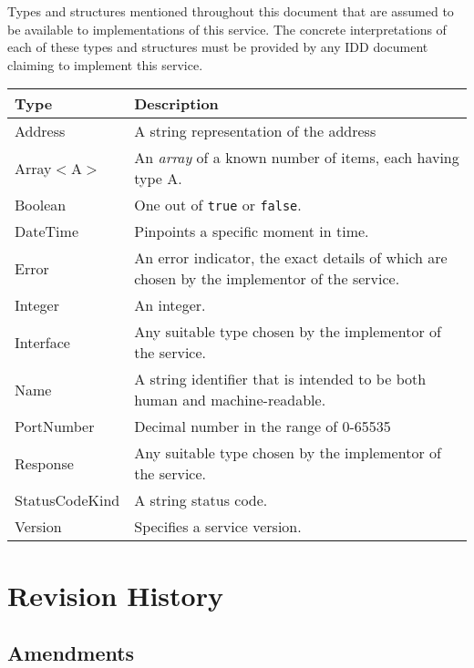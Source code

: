 \documentclass[a4paper]{arrowhead}
\newcommand{\pdef}[1]{{\textcolor{ArrowheadGrey}{#1\label{sec:model:primitives:#1}\label{sec:model:primitives:#1s}\label{sec:model:primitives:#1es}}}}
\begin{document}
Types and structures mentioned throughout this document that are assumed to be available to implementations of this service.
The concrete interpretations of each of these types and structures must be provided by any IDD document claiming to implement this service.


\begin{table}[ht!]
\begin{tabularx}{\textwidth}{| p{3cm} | X |} \hline
\rowcolor{gray!33} Type & Description \\ \hline
\pdef{Address}          & A string representation of the address \\ \hline
\pdef{Array}$<$A$>$     & An \textit{array} of a known number of items, each having type A. \\ \hline
\pdef{Boolean}          & One out of \texttt{true} or \texttt{false}. \\ \hline
\pdef{DateTime}         & Pinpoints a specific moment in time. \\ \hline
\pdef{Error}            & An error indicator, the exact details of which are chosen by the implementor of the service. \\ \hline
\pdef{Integer}          & An integer. \\ \hline
\pdef{Interface}        & Any suitable type chosen by the implementor of the service. \\ \hline
\pdef{Name}             & A string identifier that is intended to be both human and machine-readable. \\ \hline
\pdef{PortNumber}       & Decimal number in the range of 0-65535 \\ \hline
\pdef{Response}         & Any suitable type chosen by the implementor of the service. \\ \hline
\pdef{StatusCodeKind}   & A string status code. \\ \hline
\pdef{Version}          & Specifies a service version. \\ \hline
\end{tabularx}
\end{table}

\newpage




\newpage

\section{Revision History}
\subsection{Amendments}
\end{document}
